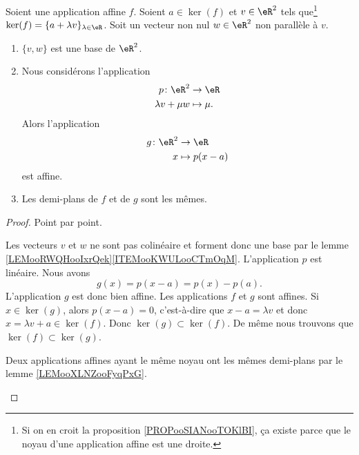 \begin{lemma}        \label{LEMooBWFSooBkIcOg}
	Soient une application affine \( f\). Soient \( a\in\ker(f)\) et \( v\in \eR^2\) tels que\footnote{Si on en croit la proposition \ref{PROPooSIANooTOKlBI}, ça existe parce que le noyau d'une application affine est une droite.} \( \ker(f)=\{ a+\lambda v \}_{\lambda\in \eR}\). Soit un vecteur non nul \( w\in \eR^2\) non parallèle à \( v\).
	\begin{enumerate}
		\item       \label{ITEMooYDYPooRzupcO}
		      \( \{ v,w \}\) est une base de \( \eR^2\).
		\item       \label{ITEMooHKVWooLAEMTm}
		      Nous considérons l'application
		      \begin{equation}
			      \begin{aligned}
				      p\colon \eR^2   & \to \eR       \\
				      \lambda v+\mu w & \mapsto  \mu.
			      \end{aligned}
		      \end{equation}
		      Alors l'application
		      \begin{equation}
			      \begin{aligned}
				      g\colon \eR^2 & \to \eR        \\
				      x             & \mapsto p(x-a)
			      \end{aligned}
		      \end{equation}
		      est affine.
		\item       \label{ITEMooGRZGooMFQPjM}
		      Les demi-plans de \( f\) et de \( g\) sont les mêmes.
	\end{enumerate}
\end{lemma}

\begin{proof}
	Point par point.
	\begin{subproof}
		Les vecteurs \( v\) et \( w\) ne sont pas colinéaire et forment donc une base par le lemme \ref{LEMooRWQHooIxrQek}\ref{ITEMooKWULooCTmOqM}.
		L'application \( p\) est linéaire. Nous avons
		\begin{equation}
			g(x)=p(x-a)=p(x)-p(a).
		\end{equation}
		L'application \( g\) est donc bien affine.
		Les applications \( f\) et \( g\) sont affines. Si \( x\in\ker(g)\), alors \( p(x-a)=0\), c'est-à-dire que \( x-a=\lambda v\) et donc \( x=\lambda v+a\in \ker(f)\). Donc \( \ker(g)\subset\ker(f)\). De même nous trouvons que \( \ker(f)\subset\ker(g)\).

		Deux applications affines ayant le même noyau ont les mêmes demi-plans par le lemme \ref{LEMooXLNZooFyqPxG}.
	\end{subproof}
\end{proof}

